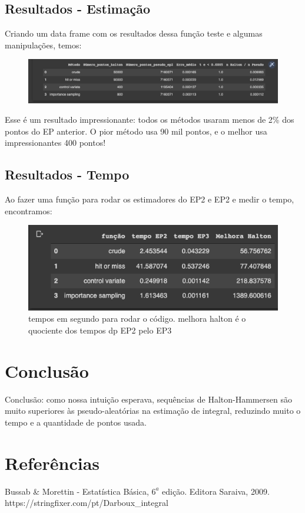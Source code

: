 \documentclass{article}
\begin{document}
\subsection{Resultados - Estimação}
Criando um data frame com os resultados dessa função teste e algumas manipulações, temos:
\begin{figure}[ht]
\centering
\includegraphics[width=1\textwidth]{results.png}
\end{figure}

Esse é um resultado impressionante: todos os métodos usaram menos de 2\% dos pontos do EP anterior. O pior método usa 90 mil pontos, e o melhor usa impressionantes 400 pontos!


\subsection{Resultados - Tempo}
Ao fazer uma função para rodar os estimadores do EP2 e EP2 e medir o tempo, encontramos:

\begin{figure}[ht]
\centering
\includegraphics[width=1\textwidth]{comparacao.png}
\caption{\label{fig:comparacao} tempos em segundo para rodar o código. melhora halton é o quociente dos tempos dp EP2 pelo EP3  }
\end{figure}

\section{Conclusão}
Conclusão: como nossa intuição esperava, sequências de Halton-Hammersen são muito superiores às pseudo-aleatórias na estimação de integral, reduzindo muito o tempo e a quantidade de pontos usada.

\section{Referências}
Bussab \& Morettin - Estatística Básica, $6^a$ edição. Editora Saraiva, 2009.
\\
https://stringfixer.com/pt/Darboux\_integral
\end{document}
